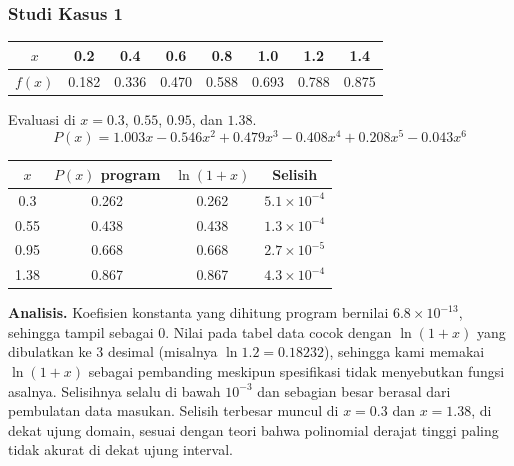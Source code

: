 \subsubsection{Studi Kasus 1}
\begin{kasus}
\begin{center}
\begin{tabular}{c|ccccccc}
$x$ & 0.2 & 0.4 & 0.6 & 0.8 & 1.0 & 1.2 & 1.4 \\ \hline
$f(x)$ & 0.182 & 0.336 & 0.470 & 0.588 & 0.693 & 0.788 & 0.875
\end{tabular}
\end{center}
Evaluasi di $x = 0.3$, $0.55$, $0.95$, dan $1.38$.
\[
P(x) = 1.003x - 0.546x^2 + 0.479x^3 - 0.408x^4 + 0.208x^5 - 0.043x^6
\]
\begin{center}
\begin{tabular}{cccc}
\toprule
$x$ & $P(x)$ program & $\ln(1+x)$ & Selisih \\
\midrule
0.3  & 0.262 & 0.262 & $5.1 \times 10^{-4}$ \\
0.55 & 0.438 & 0.438 & $1.3 \times 10^{-4}$ \\
0.95 & 0.668 & 0.668 & $2.7 \times 10^{-5}$ \\
1.38 & 0.867 & 0.867 & $4.3 \times 10^{-4}$ \\
\bottomrule
\end{tabular}
\end{center}
\begin{center}
    \begin{minipage}{0.48\textwidth}
        \centering
    \end{minipage}\hfill
    \begin{minipage}{0.48\textwidth}
        \centering
    \end{minipage}
\end{center}\end{kasus}

\textbf{Analisis.} Koefisien konstanta yang dihitung program bernilai $6.8 \times 10^{-13}$, sehingga tampil sebagai 0. Nilai pada tabel data cocok dengan $\ln(1+x)$ yang dibulatkan ke 3 desimal (misalnya $\ln 1.2 = 0.18232$), sehingga kami memakai $\ln(1+x)$ sebagai pembanding meskipun spesifikasi tidak menyebutkan fungsi asalnya. Selisihnya selalu di bawah $10^{-3}$ dan sebagian besar berasal dari pembulatan data masukan. Selisih terbesar muncul di $x = 0.3$ dan $x = 1.38$, di dekat ujung domain, sesuai dengan teori bahwa polinomial derajat tinggi paling tidak akurat di dekat ujung interval.

